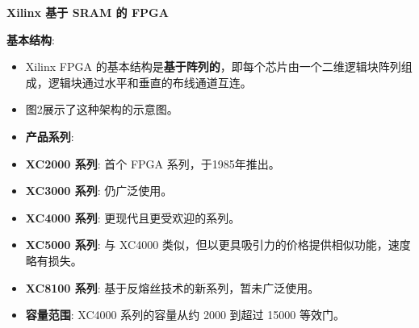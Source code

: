 \documentclass[
  ignorenonframetext,
  chinese,
]{beamer}
\begin{document}
\begin{frame}
\begin{block}{\textbf{Xilinx 基于 SRAM 的 FPGA}}
\label{xilinx-ux57faux4e8e-sram-ux7684-fpga}
\begin{block}{\textbf{基本结构}:}
\label{ux57faux672cux7ed3ux6784}
\begin{itemize}
\item
  Xilinx FPGA
  的基本结构是\textbf{基于阵列的}，即每个芯片由一个二维逻辑块阵列组成，逻辑块通过水平和垂直的布线通道互连。
\item
  图2展示了这种架构的示意图。
\item
  \textbf{产品系列}:
\item
  \textbf{XC2000 系列}: 首个 FPGA 系列，于1985年推出。
\item
  \textbf{XC3000 系列}: 仍广泛使用。
\item
  \textbf{XC4000 系列}: 更现代且更受欢迎的系列。
\item
  \textbf{XC5000 系列}: 与 XC4000
  类似，但以更具吸引力的价格提供相似功能，速度略有损失。
\item
  \textbf{XC8100 系列}: 基于反熔丝技术的新系列，暂未广泛使用。
\item
  \textbf{容量范围}: XC4000 系列的容量从约 2000 到超过 15000 等效门。
\end{itemize}
\end{block}
\end{block}
\end{frame}
\end{document}
